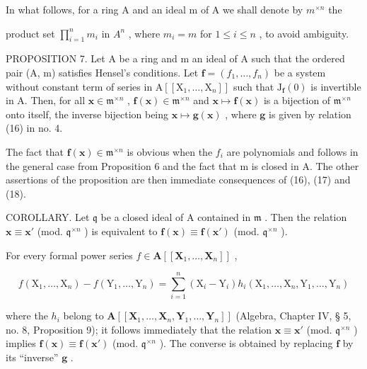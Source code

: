 In what follows, for a ring A and an ideal m of A we shall denote by \(m^{\times n}\) the

product set \(\prod_{i=1}^{n} m_i\) in \(A^n\) , where \(m_i = m\) for \(1 \leqslant i \leqslant n\) , to avoid ambiguity.

PROPOSITION 7. Let A be a ring and m an ideal of A such that the ordered pair (A, m) satisfies Hensel's conditions. Let \(\mathbf{f} = (f_1, \ldots, f_n)\) be a system without constant term of series in \(\mathrm{A}[[\mathrm{X}_1, \ldots, \mathrm{X}_n]]\) such that \(\mathrm{J}_{\mathbf{f}}(0)\) is invertible in A. Then, for all \(\mathbf{x} \in \mathfrak{m}^{\times n}\) , \(\mathbf{f}(\mathbf{x}) \in \mathfrak{m}^{\times n}\) and \(\mathbf{x} \mapsto \mathbf{f}(\mathbf{x})\) is a bijection of \(\mathfrak{m}^{\times n}\) onto itself, the inverse bijection being \(\mathbf{x} \mapsto \mathbf{g}(\mathbf{x})\) , where \(\mathbf{g}\) is given by relation (16) in no. 4.

The fact that \(\mathbf{f}(\mathbf{x})\in\mathfrak{m}^{\times n}\) is obvious when the \(f_{i}\) are polynomials and follows in the general case from Proposition 6 and the fact that m is closed in A. The other assertions of the proposition are then immediate consequences of (16), (17) and (18).

COROLLARY. Let \(\mathfrak{q}\) be a closed ideal of A contained in \(\mathfrak{m}\) . Then the relation \(\mathbf{x} \equiv \mathbf{x}'\) (mod. \(\mathfrak{q}^{\times n}\) ) is equivalent to \(\mathbf{f}(\mathbf{x}) \equiv \mathbf{f}(\mathbf{x}')\) (mod. \(\mathfrak{q}^{\times n}\) ).

For every formal power series \(f \in \mathbf{A}[[\mathbf{X}_1, \ldots, \mathbf{X}_n]]\) ,

\[
f \left(\mathrm{X} _ {1}, \dots , \mathrm{X} _ {n}\right) - f \left(\mathrm{Y} _ {1}, \dots , \mathrm{Y} _ {n}\right) = \sum_ {i = 1} ^ {n} \left(\mathrm{X} _ {i} - \mathrm{Y} _ {i}\right) h _ {i} \left(\mathrm{X} _ {1}, \dots , \mathrm{X} _ {n}, \mathrm{Y} _ {1}, \dots , \mathrm{Y} _ {n}\right)
\]

where the \(h_i\) belong to \(\mathbf{A}[[\mathbf{X}_1,\ldots,\mathbf{X}_n,\mathbf{Y}_1,\ldots,\mathbf{Y}_n]]\) (Algebra, Chapter IV, § 5, no. 8, Proposition 9); it follows immediately that the relation \(\mathbf{x} \equiv \mathbf{x}'\) (mod. \(\mathfrak{q}^{\times n}\) ) implies \(\mathbf{f}(\mathbf{x}) \equiv \mathbf{f}(\mathbf{x}')\) (mod. \(\mathfrak{q}^{\times n}\) ). The converse is obtained by replacing \(\mathbf{f}\) by its ``inverse'' \(\mathbf{g}\) .

